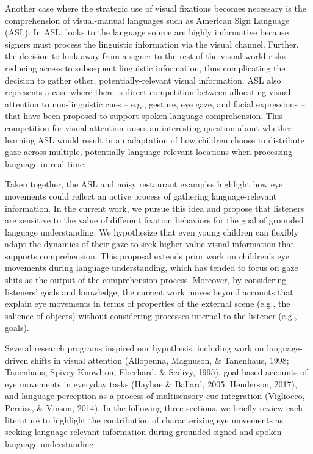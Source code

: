 \documentclass[,man,floatsintext]{apa6}
\begin{document}
Another case where the strategic use of visual fixations becomes necessary is the comprehension of visual-manual languages such as American Sign Language (ASL). In ASL, looks to the language source are highly informative because signers must process the linguistic information via the visual channel. Further, the decision to look away from a signer to the rest of the visual world risks reducing access to subsequent linguistic information, thus complicating the decision to gather other, potentially-relevant visual information. ASL also represents a case where there is direct competition between allocating visual attention to non-linguistic cues -- e.g., gesture, eye gaze, and facial expressions -- that have been proposed to support spoken language comprehension. This competition for visual attention raises an interesting question about whether learning ASL would result in an adaptation of how children choose to distribute gaze across multiple, potentially language-relevant locations when processing language in real-time.

Taken together, the ASL and noisy restaurant examples highlight how eye movements could reflect an active process of gathering language-relevant information. In the current work, we pursue this idea and propose that listeners are sensitive to the value of different fixation behaviors for the goal of grounded language understanding. We hypothesize that even young children can flexibly adapt the dynamics of their gaze to seek higher value visual information that supports comprehension. This proposal extends prior work on children's eye movements during language understanding, which has tended to focus on gaze shits as the output of the comprehension process. Moreover, by considering listeners' goals and knowledge, the current work moves beyond accounts that explain eye movements in terms of properties of the external scene (e.g., the salience of objects) without considering processes internal to the listener (e.g., goals).

Several research programs inspired our hypothesis, including work on language-driven shifts in visual attention (Allopenna, Magnuson, \& Tanenhaus, 1998; Tanenhaus, Spivey-Knowlton, Eberhard, \& Sedivy, 1995), goal-based accounts of eye movements in everyday tasks (Hayhoe \& Ballard, 2005; Henderson, 2017), and language perception as a process of multisensory cue integration (Vigliocco, Perniss, \& Vinson, 2014). In the following three sections, we briefly review each literature to highlight the contribution of characterizing eye movements as seeking language-relevant information during grounded signed and spoken language understanding.
\end{document}
